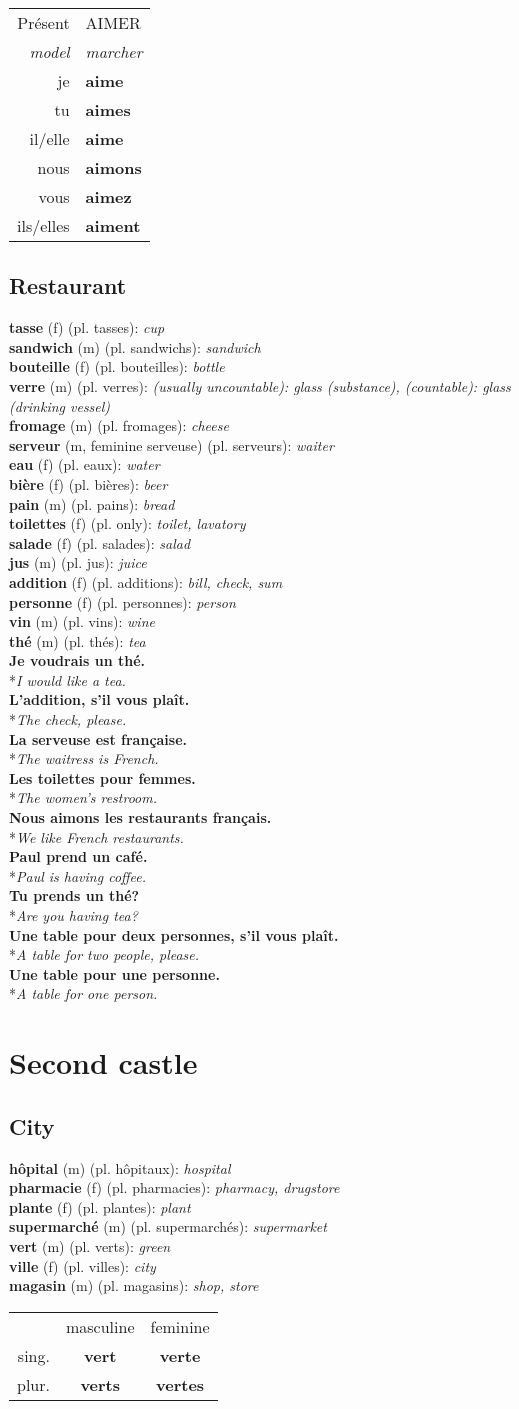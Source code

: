 \documentclass[a4paper,11pt,oneside]{book}
\newcommand{\phrase}[2]{\noindent\textbf{#1}\\*\-\hspace{0.5cm}\textit{#2}\\}
\newcommand{\verbconjm}[9]{
\begin{tabular}{rl}
#1 & \MakeUppercase{#2} \\ 
\textit{model} & \textit{#9} \\  
je & \textbf{#3} \\  
tu & \textbf{#4} \\
il/elle & \textbf{#5} \\  
nous & \textbf{#6} \\  
vous & \textbf{#7} \\  
ils/elles & \textbf{#8}  
\end{tabular}
}
\newcommand{\noundecl}[4]{
\begin{tabular}{rcc}
 & masculine & feminine \\
 sing. & \textbf{#1} & \textbf{#2} \\
 plur. & \textbf{#3} & \textbf{#4}
\end{tabular}
}
\newcommand{\noundef}[4]{\textbf{#1} (#3) (pl. #2): \textit{#4}\\}
\begin{document}
\begin{center}
\verbconjm{Présent}{aimer}{aime}{aimes}{aime}{aimons}{aimez}{aiment}{marcher}
\end{center}

\section{Restaurant}

\noundef{tasse}{tasses}{f}{cup}
\noundef{sandwich}{sandwichs}{m}{sandwich}
\noundef{bouteille}{bouteilles}{f}{bottle}
\noundef{verre}{verres}{m}{(usually uncountable): glass (substance), (countable): glass (drinking vessel)}
\noundef{fromage}{fromages}{m}{cheese}
\noundef{serveur}{serveurs}{m, feminine serveuse}{waiter}
\noundef{eau}{eaux}{f}{water}
\noundef{bière}{bières}{f}{beer}
\noundef{pain}{pains}{m}{bread}
\noundef{toilettes}{only}{f}{toilet, lavatory}
\noundef{salade}{salades}{f}{salad}
\noundef{jus}{jus}{m}{juice}
\noundef{addition}{additions}{f}{bill, check, sum}
\noundef{personne}{personnes}{f}{person}
\noundef{vin}{vins}{m}{wine}
\noundef{thé}{thés}{m}{tea}

\phrase{Je voudrais un thé.}{I would like a tea.}
\phrase{L'addition, s'il vous plaît.}{The check, please.}
\phrase{La serveuse est française.}{The waitress is French.}
\phrase{Les toilettes pour femmes.}{The women's restroom.}
\phrase{Nous aimons les restaurants français.}{We like French restaurants.}
\phrase{Paul prend un café.}{Paul is having coffee.}
\phrase{Tu prends un thé?}{Are you having tea?}
\phrase{Une table pour deux personnes, s'il vous plaît.}{A table for two people, please.}
\phrase{Une table pour une personne.}{A table for one person.}

\chapter{Second castle}

\section{City}

\noundef{hôpital}{hôpitaux}{m}{hospital}
\noundef{pharmacie}{pharmacies}{f}{pharmacy, drugstore}
\noundef{plante}{plantes}{f}{plant}
\noundef{supermarché}{supermarchés}{m}{supermarket}
\noundef{vert}{verts}{m}{green}
\noundef{ville}{villes}{f}{city}
\noundef{magasin}{magasins}{m}{shop, store}

\begin{center}
\noundecl{vert}{verte}{verts}{vertes}
\end{center}
\end{document}
